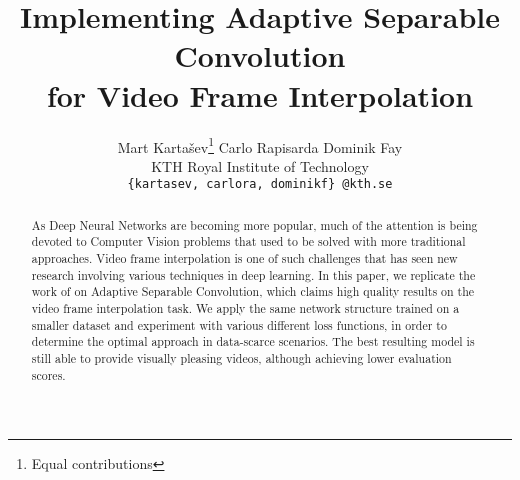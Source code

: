 \documentclass[10pt,twocolumn,letterpaper]{article}
\begin{document}

\title{Implementing Adaptive Separable Convolution\\
for Video Frame Interpolation}


\author{%
Mart Kartašev\thanks{Equal contributions}\qquad%
Carlo Rapisarda\footnotemark[1]\qquad%
Dominik Fay\footnotemark[1]\\
KTH Royal Institute of Technology\\
{\tt\small \{kartasev, carlora, dominikf\} @kth.se}}

\maketitle


\begin{abstract}
\label{sec:abstract}

As Deep Neural Networks are becoming more popular, much of the attention is being devoted to Computer Vision problems that used to be solved with more traditional approaches. Video frame interpolation is one of such challenges that has seen new research involving various techniques in deep learning. In this paper, we replicate the work of \textnormal{\citeauthor{SepConv}} on Adaptive Separable Convolution, which claims high quality results on the video frame interpolation task. We apply the same network structure trained on a smaller dataset and experiment with various different loss functions, in order to determine the optimal approach in data-scarce scenarios. The best resulting model is still able to provide visually pleasing videos, although achieving lower evaluation scores.
\end{abstract}
\end{document}
